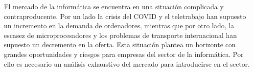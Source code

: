 El mercado de la informática se encuentra en una situación complicada y contraproducente. Por un lado la crisis del COVID y el teletrabajo han supuesto un incremento en la demanda de ordenadores, mientras que por otro lado, la escasez de microprocesadores y los problemas de transporte internacional han supuesto un decremento en la oferta. Esta situación plantea un horizonte con grandes oportunidades y riesgos para empresas del sector de la informática. Por ello es necesario un análisis exhaustivo del mercado para introducirse en el sector.



